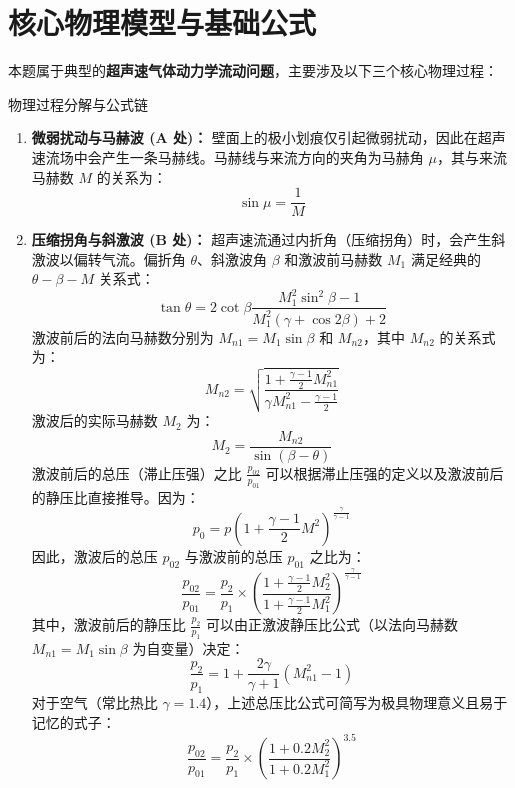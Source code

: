 \documentclass[a4paper,11pt]{article}
\begin{document}
\section{核心物理模型与基础公式}

本题属于典型的\textbf{超声速气体动力学流动问题}，主要涉及以下三个核心物理过程：

\begin{keypointbox}{物理过程分解与公式链}
\begin{enumerate}
    \item \textbf{微弱扰动与马赫波 (A 处)：}
    壁面上的极小划痕仅引起微弱扰动，因此在超声速流场中会产生一条马赫线。马赫线与来流方向的夹角为马赫角 $\mu$，其与来流马赫数 $M$ 的关系为：
    \begin{equation}
        \sin \mu = \frac{1}{M}
    \end{equation}
    
    \item \textbf{压缩拐角与斜激波 (B 处)：}
    超声速流通过内折角（压缩拐角）时，会产生斜激波以偏转气流。偏折角 $\theta$、斜激波角 $\beta$ 和激波前马赫数 $M_1$ 满足经典的 $\theta-\beta-M$ 关系式：
    \begin{equation}
        \tan \theta = 2 \cot \beta \frac{M_1^2 \sin^2 \beta - 1}{M_1^2 (\gamma + \cos 2\beta) + 2}
    \end{equation}
    激波前后的法向马赫数分别为 $M_{n1} = M_1 \sin \beta$ 和 $M_{n2}$，其中 $M_{n2}$ 的关系式为：
    \begin{equation}
        M_{n2} = \sqrt{\frac{1 + \frac{\gamma-1}{2} M_{n1}^2}{\gamma M_{n1}^2 - \frac{\gamma-1}{2}}}
    \end{equation}
    激波后的实际马赫数 $M_2$ 为：
    \begin{equation}
        M_2 = \frac{M_{n2}}{\sin(\beta - \theta)}
    \end{equation}
    激波前后的总压（滞止压强）之比 $\frac{p_{02}}{p_{01}}$ 可以根据滞止压强的定义以及激波前后的静压比直接推导。因为：
    \begin{equation}
        p_0 = p \left( 1 + \frac{\gamma-1}{2} M^2 \right)^{\frac{\gamma}{\gamma-1}}
    \end{equation}
    因此，激波后的总压 $p_{02}$ 与激波前的总压 $p_{01}$ 之比为：
    \begin{equation}
        \frac{p_{02}}{p_{01}} = \frac{p_2}{p_1} \times \left( \frac{1 + \frac{\gamma-1}{2} M_2^2}{1 + \frac{\gamma-1}{2} M_1^2} \right)^{\frac{\gamma}{\gamma-1}}
    \end{equation}
    其中，激波前后的静压比 $\frac{p_2}{p_1}$ 可以由正激波静压比公式（以法向马赫数 $M_{n1} = M_1 \sin \beta$ 为自变量）决定：
    \begin{equation}
        \frac{p_2}{p_1} = 1 + \frac{2\gamma}{\gamma+1} (M_{n1}^2 - 1)
    \end{equation}
    对于空气（常比热比 $\gamma = 1.4$），上述总压比公式可简写为极具物理意义且易于记忆的式子：
    \begin{equation}
        \frac{p_{02}}{p_{01}} = \frac{p_2}{p_1} \times \left( \frac{1 + 0.2 M_2^2}{1 + 0.2 M_1^2} \right)^{3.5}
    \end{equation}
    

\end{enumerate}
\end{keypointbox}
\end{document}
